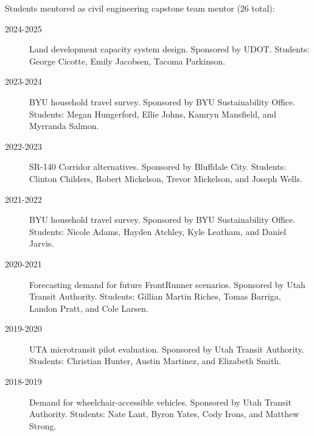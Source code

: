 \documentclass[margin,line]{res}
\newif\ifdetail
\newcommand{\secfont}{\scshape }
\newcommand{\acc}{\scshape }
\begin{document}
\begin{resume}
Students mentored as civil engineering capstone team mentor (26 total):
\vspace{0.2cm}
\begin{description}
  \ifdetail {\color{NavyBlue} \fi
  \item[2024-2025] Land development capacity system design. Sponsored by UDOT. Students: George Cicotte, Emily Jacobsen, Tacoma Parkinson.
  \item[2023-2024] BYU household travel survey. Sponsored by BYU Sustainability Office. Students: 
    Megan Hungerford, Ellie Johns, Kamryn Mansfield, and Myrranda Salmon.
  \item[2022-2023] SR-140 Corridor alternatives. Sponsored by Bluffdale City. Students:
    Clinton Childers, Robert Mickelson, Trevor Mickelson, and Joseph Wells.
  \item[2021-2022] BYU household travel survey. Sponsored by BYU Sustainability Office. Students: Nicole Adams, Hayden Atchley, Kyle Leatham, and Daniel Jarvis.
  \item[2020-2021] Forecasting demand for future FrontRunner scenarios. Sponsored by Utah Transit Authority. Students: Gillian Martin Riches, Tomas Barriga, Landon Pratt, and Cole Larsen.
  \ifdetail } \fi
  \item[2019-2020] UTA microtransit pilot evaluation. Sponsored by Utah Transit Authority. Students: Christian Hunter, Austin Martinez, and Elizabeth Smith.
  \item[2018-2019] Demand for wheelchair-accessible vehicles. Sponsored by Utah Transit Authority. Students: Nate Lant, Byron Yates, Cody Irons, and Matthew Strong.
\end{description}


%



\noindent\makebox[\linewidth]{\rule{\linewidth}{0.4pt}}

\end{resume}
\end{document}
